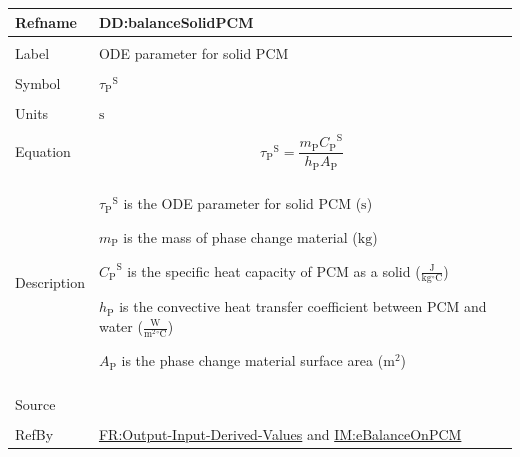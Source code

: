 \documentclass[12pt]{article}
\begin{document}
\vspace{\baselineskip}
\noindent
\begin{minipage}{\textwidth}
\begin{tabular}{>{\raggedright}p{}>{\raggedright\arraybackslash}p{}}
\toprule \textbf{Refname} & \textbf{DD:balanceSolidPCM}
\label{DD:balanceSolidPCM}
\\ \midrule \\
Label & ODE parameter for solid PCM
        
\\ \midrule \\
Symbol & ${{τ_{\text{P}}}^{\text{S}}}$
         
\\ \midrule \\
Units & ${\text{s}}$
        
\\ \midrule \\
Equation & \begin{displaymath}
           {{τ_{\text{P}}}^{\text{S}}}=\frac{{m_{\text{P}}} {{C_{\text{P}}}^{\text{S}}}}{{h_{\text{P}}} {A_{\text{P}}}}
           \end{displaymath}
\\ \midrule \\
Description & \begin{symbDescription}
              \item{${{τ_{\text{P}}}^{\text{S}}}$ is the ODE parameter for solid PCM (${\text{s}}$)}
              \item{${m_{\text{P}}}$ is the mass of phase change material (${\text{kg}}$)}
              \item{${{C_{\text{P}}}^{\text{S}}}$ is the specific heat capacity of PCM as a solid ($\frac{\text{J}}{\text{kg}{}^{\circ}\text{C}}$)}
              \item{${h_{\text{P}}}$ is the convective heat transfer coefficient between PCM and water ($\frac{\text{W}}{\text{m}^{2}{}^{\circ}\text{C}}$)}
              \item{${A_{\text{P}}}$ is the phase change material surface area (${\text{m}^{2}}$)}
              \end{symbDescription}
\\ \midrule \\
Source & \cite{lightstone2012}
         
\\ \midrule \\
RefBy & \hyperref[outputInputDerivVals]{FR:Output-Input-Derived-Values} and \hyperref[IM:eBalanceOnPCM]{IM:eBalanceOnPCM}
        
\\ \bottomrule
\end{tabular}
\end{minipage}
\end{document}
